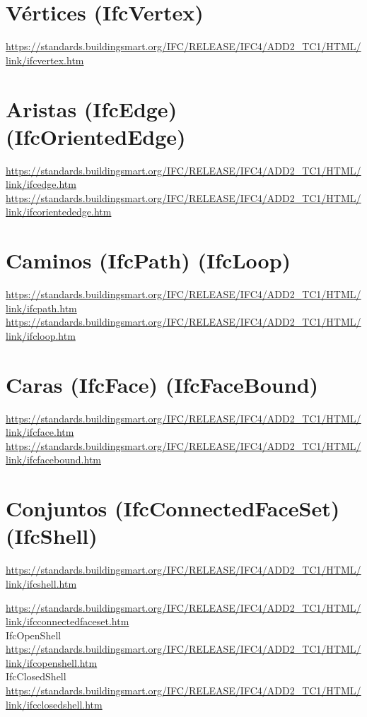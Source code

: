 \documentclass[spanish,12pt,a4paper,final,oneside]{book}
\begin{document}
\section{Vértices (IfcVertex)}
\url{https://standards.buildingsmart.org/IFC/RELEASE/IFC4/ADD2_TC1/HTML/link/ifcvertex.htm}


\section{Aristas (IfcEdge) (IfcOrientedEdge)}
\url{https://standards.buildingsmart.org/IFC/RELEASE/IFC4/ADD2_TC1/HTML/link/ifcedge.htm}
\\ \url{https://standards.buildingsmart.org/IFC/RELEASE/IFC4/ADD2_TC1/HTML/link/ifcorientededge.htm}


\section{Caminos (IfcPath) (IfcLoop)}
\url{https://standards.buildingsmart.org/IFC/RELEASE/IFC4/ADD2_TC1/HTML/link/ifcpath.htm}
\\ \url{https://standards.buildingsmart.org/IFC/RELEASE/IFC4/ADD2_TC1/HTML/link/ifcloop.htm}

\section{Caras (IfcFace) (IfcFaceBound)}
\url{https://standards.buildingsmart.org/IFC/RELEASE/IFC4/ADD2_TC1/HTML/link/ifcface.htm}
\\ \url{https://standards.buildingsmart.org/IFC/RELEASE/IFC4/ADD2_TC1/HTML/link/ifcfacebound.htm}

\section{Conjuntos (IfcConnectedFaceSet) (IfcShell)}
\url{https://standards.buildingsmart.org/IFC/RELEASE/IFC4/ADD2_TC1/HTML/link/ifcshell.htm}

\url{https://standards.buildingsmart.org/IFC/RELEASE/IFC4/ADD2_TC1/HTML/link/ifcconnectedfaceset.htm}
\\IfcOpenShell
\\ \url{https://standards.buildingsmart.org/IFC/RELEASE/IFC4/ADD2_TC1/HTML/link/ifcopenshell.htm}
\\IfcClosedShell
\\ \url{https://standards.buildingsmart.org/IFC/RELEASE/IFC4/ADD2_TC1/HTML/link/ifcclosedshell.htm}
\end{document}
